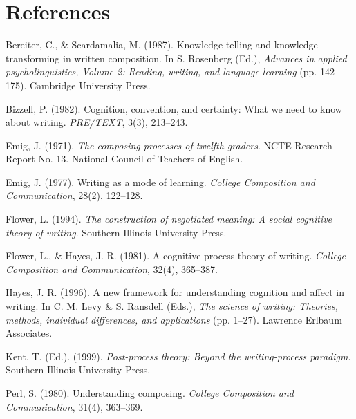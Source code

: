 \documentclass[12pt]{article}
\begin{document}
\section*{References}

Bereiter, C., \& Scardamalia, M. (1987). Knowledge telling and knowledge transforming in written composition. In S. Rosenberg (Ed.), \textit{Advances in applied psycholinguistics, Volume 2: Reading, writing, and language learning} (pp. 142--175). Cambridge University Press.

Bizzell, P. (1982). Cognition, convention, and certainty: What we need to know about writing. \textit{PRE/TEXT}, 3(3), 213--243.

Emig, J. (1971). \textit{The composing processes of twelfth graders}. NCTE Research Report No. 13. National Council of Teachers of English.

Emig, J. (1977). Writing as a mode of learning. \textit{College Composition and Communication}, 28(2), 122--128.

Flower, L. (1994). \textit{The construction of negotiated meaning: A social cognitive theory of writing}. Southern Illinois University Press.

Flower, L., \& Hayes, J. R. (1981). A cognitive process theory of writing. \textit{College Composition and Communication}, 32(4), 365--387.

Hayes, J. R. (1996). A new framework for understanding cognition and affect in writing. In C. M. Levy \& S. Ransdell (Eds.), \textit{The science of writing: Theories, methods, individual differences, and applications} (pp. 1--27). Lawrence Erlbaum Associates.

Kent, T. (Ed.). (1999). \textit{Post-process theory: Beyond the writing-process paradigm}. Southern Illinois University Press.

Perl, S. (1980). Understanding composing. \textit{College Composition and Communication}, 31(4), 363--369.
\end{document}
